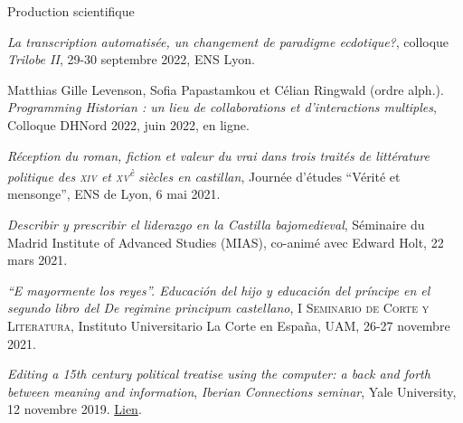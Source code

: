 \begin{rubric}{Production scientifique}
                    
                    \entry*
                
                        \textit{La transcription automatisée, un changement de paradigme
                            ecdotique?}, colloque \textit{Trilobe II}, 29-30 septembre 2022,
                        ENS Lyon.
                    
                    \entry*
                Matthias Gille Levenson, Sofia Papastamkou et Célian Ringwald (ordre
                        alph.). \textit{Programming Historian : un lieu de collaborations et
                            d’interactions multiples}, Colloque DHNord 2022, juin 2022, en
                        ligne.
                    
                    \entry*
                \textit{Réception du roman, fiction et valeur du vrai dans trois traités de
                            littérature politique des \textsc{xiv} et
                                \textsc{xv}\textsuperscript{è} siècles en castillan}, Journée
                        d'études \enquote{Vérité et mensonge}, ENS de Lyon, 6 mai 2021.
                    
                    \entry*
                \textit{Describir y prescribir el liderazgo en la Castilla
                            bajomedieval}, Séminaire du Madrid Institute of Advanced Studies
                        (MIAS), co-animé avec Edward Holt, 22 mars 2021.
                    
                    \entry*
                
                        \textit{``E mayormente los reyes''. Educación del hijo y educación del príncipe en
                            el segundo libro del \textit{De regimine principum} castellano},
                            \textsc{I Seminario de Corte y Literatura}, Instituto Universitario La Corte
                        en España, UAM, 26-27 novembre 2021.
                    
                    \entry*
                
                        \textit{\textit{Editing a 15th century political treatise using the computer: a back
                                and forth between meaning and information}}, \textit{Iberian
                            Connections seminar}, Yale University, 12 novembre 2019. \href{https://iberian-connections.yale.edu/articles/editing-a-xvth-century-political-treatise-using-the-computer/}{Lien}.
                    

\end{rubric}

